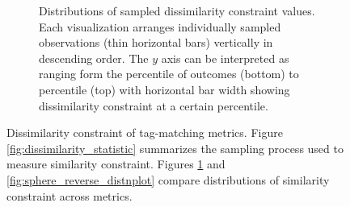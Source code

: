 \begin{figure}
\begin{center}
\begin{subfigure}[b]{\columnwidth}
\caption{
Distributions of sampled dissimilarity constraint values.
Each visualization arranges individually sampled observations (thin horizontal bars) vertically in descending order.
The $y$ axis can be interpreted as ranging form the  percentile of outcomes (bottom) to  percentile (top) with horizontal bar width showing dissimilarity constraint at a certain percentile.
}
\label{fig:sphere_reverse_barplot}
\end{subfigure}

\caption{
Dissimilarity constraint of tag-matching metrics.
Figure \ref{fig:dissimilarity_statistic} summarizes the sampling process used to measure similarity constraint.
Figures \ref{fig:sphere_reverse_barplot} and \ref{fig:sphere_reverse_distnplot} compare distributions of similarity constraint across metrics.
}
\label{fig:sphere_reverse}

\end{center}
\end{figure}
